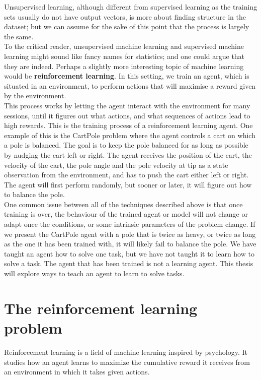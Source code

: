 Unsupervised learning, although different from supervised learning as the
training sets usually do not have output vectors, is more about finding
structure in the dataset; but we can assume for the sake of this point that
the process is largely the same.\\

To the critical reader, unsupervised machine learning and supervised machine
learning might sound like fancy names for statistics; and one could argue that
they are indeed. Perhaps a slightly more interesting topic of machine learning
would be \textbf{reinforcement learning}. In this setting, we train an agent, 
which is situated in an environment, to perform actions that will maximise
a reward given by the environment.\\

This process works by letting the agent interact with the environment for many
sessions, until it figures out what actions, and what sequences of actions lead
to high rewards. This is the training process of a reinforcement learning agent.
One example of this is the CartPole problem \cite{barto-cartpole} where the
agent controls a cart on which a pole is balanced. The goal is to keep the
pole balanced for as long as possible by nudging the cart left or right. The
agent receives the position of the cart, the velocity of the cart, the pole
angle and the pole velocity at tip as a state observation from the environment,
and has to push the cart either left or right. The agent will first perform
randomly, but sooner or later, it will figure out how to balance the pole.\\

One common issue between all of the techniques described above is that once
training is over, the behaviour of the trained agent or model will not change
or adapt once the conditions, or some intrinsic parameters of the problem
change. If we present the CartPole agent with a pole that is twice as heavy,
or twice as long as the one it has been trained with, it will likely fail to 
balance the pole. We have taught an agent how to solve one task, but we have
not taught it to learn how to solve a task. The agent that has been trained is
not a learning agent. This thesis will explore ways to teach an agent to learn
to solve tasks.

\section{The reinforcement learning problem}
Reinforcement learning is a field of machine learning inspired by psychology.
It studies how an agent learns to maximize the cumulative reward it receives
from an environment in which it takes given actions.\\

